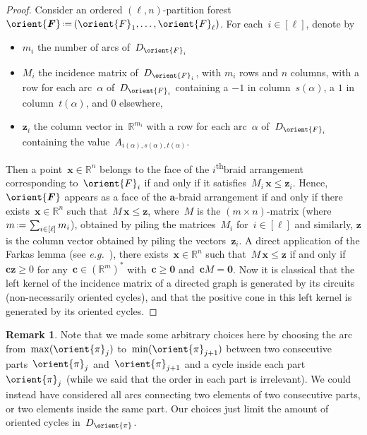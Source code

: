 \documentclass{amsart}
\theoremstyle{definition}
\newtheorem{remark}[theorem]{Remark}
\newcommand{\R}{\mathbb{R}} %
\renewcommand{\b}[1]{{\boldsymbol{#1}}} %
\newcommand{\eqdef}{\mbox{\,\raisebox{0.2ex}{\scriptsize\ensuremath{\mathrm:}}\ensuremath{=}\,}} %
\newcommand{\eg}{\textit{e.g.}~} %
\newcommand{\ordinal}{\textsuperscript{th}} %
\renewcommand{\b}[1]{\boldsymbol{#1}} %
\begin{document}
\begin{proof}
Consider an ordered $(\ell,n)$-partition forest~$\orient{\b{F}} \eqdef (\orient{F}_1, \dots, \orient{F}_\ell)$.
For each~$i \in [\ell]$, denote by
\begin{itemize}
\item $m_i$ the number of arcs of~$D_{\orient{F}_i}$
\item $M_i$ the incidence matrix of~$D_{\orient{F}_i}$, with $m_i$ rows and $n$ columns, with a row for each arc~$\alpha$ of~$D_{\orient{F}_i}$ containing a $-1$ in column~$s(\alpha)$, a $1$ in column~$t(\alpha)$, and $0$ elsewhere,
\item $\b{z}_i$ the column vector in~$\R^{m_i}$ with a row for each arc~$\alpha$ of~$D_{\orient{F}_i}$ containing the value~$A_{i(\alpha), s(\alpha), t(\alpha)}$.
\end{itemize}
Then a point~$\b{x} \in \R^n$ belongs to the face of the $i$\ordinal braid arrangement corresponding to~$\orient{F}_i$ if and only if it satisfies~$M_i \, \b{x} \le \b{z}_i$.
Hence, $\orient{\b{F}}$ appears as a face of the $\b{a}$-braid arrangement if and only if there exists~$\b{x} \in \R^n$ such that~$M \, \b{x} \le \b{z}$, where~$M$ is the $(m \times n)$-matrix (where~$m \eqdef \sum_{i \in [\ell]} m_i$), obtained by piling the matrices~$M_i$ for~$i \in [\ell]$ and similarly, $\b{z}$ is the column vector obtained by piling the vectors~$\b{z}_i$.
A direct application of the Farkas lemma (see \eg \cite[Prop.~1.7]{Ziegler}), there exists~$\b{x} \in \R^n$ such that~$M \, \b{x} \le \b{z}$ if and only if~$\b{c} \b{z} \ge 0$ for any~$\b{c} \in (\R^m)^*$ with~$\b{c} \ge \b{0}$ and~$\b{c} M = \b{0}$.
Now it is classical that the left kernel of the incidence matrix of a directed graph is generated by its circuits (non-necessarily oriented cycles), and that the positive cone in this left kernel is generated by its oriented cycles.
\end{proof}

\begin{remark}
Note that we made some arbitrary choices here by choosing the arc from~$\max(\orient{\pi}_j)$ to~$\min(\orient{\pi}_{j+1})$ between two consecutive parts~$\orient{\pi}_j$ and~$\orient{\pi}_{j+1}$ and a cycle inside each part~$\orient{\pi}_j$ (while we said that the order in each part is irrelevant).
We could instead have considered all arcs connecting two elements of two consecutive parts, or two elements inside the same part.
Our choices just limit the amount of oriented cycles in~$D_{\orient{\pi}}$.
\end{remark}
\end{document}
